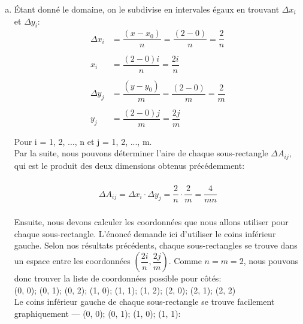 \documentclass[letterpaper,12pt,oneside,final]{book}
\begin{document}
\begin{enumerate}[a)]
\item %
Étant donné le domaine, on le subdivise en intervales égaux en trouvant $\Delta x_i$ et $\Delta y_i$: \\ 
\begin{align*}
\Delta x_i &= \dfrac{(x-x_0)}{n} = \dfrac{(2-0)}{n} = \dfrac{2}{n} \\ \\
x_i &= \dfrac{(2-0)i}{n} = \dfrac{2i}{n} \\ \\
\Delta y_j &= \dfrac{(y-y_0)}{m} = \dfrac{(2-0)}{m} = \dfrac{2}{m} \\ \\ 
y_j &= \dfrac{(2-0)j}{m} = \dfrac{2j}{m} \\ \\
\end{align*}
Pour i = 1, 2, ..., n et j = 1, 2, ..., m.\\

Par la suite, nous pouvons déterminer l'aire de chaque sous-rectangle $\Delta A_{ij}$, qui est le produit des deux dimensions obtenus précédemment: \\ \\
\begin{align*}
\Delta A_{ij} =  \Delta x_i \cdot \Delta y_j = \dfrac{2}{n} \cdot \dfrac{2}{m} = \dfrac{4}{mn} \\
\end{align*}

Ensuite, nous devons calculer les coordonnées que nous allons utiliser pour chaque sous-rectangle. L'énoncé demande ici d'utiliser le coins inférieur gauche. Selon nos résultats précédents, chaque sous-rectangles se trouve dans un espace entre les coordonnées $(\dfrac{2i}{n}, \dfrac{2j}{m})$. Comme $n = m = 2$, nous pouvons donc trouver la liste de coordonnées possible pour côtés: \\
(0, 0); (0, 1); (0, 2); (1, 0); (1, 1); (1, 2); (2, 0); (2, 1); (2, 2) \\

Le coins inférieur gauche de chaque sous-rectangle se trouve facilement graphiquement --- (0, 0); (0, 1); (1, 0); (1, 1):
\\


\end{enumerate}
\end{document}
